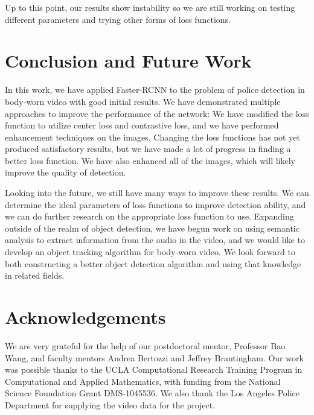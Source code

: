 \documentclass[a4paper]{article}
\begin{document}
Up to this point, our results show instability so we are still working on testing different parameters and trying other forms of loss functions.


\section{Conclusion and Future Work}

In this work, we have applied Faster-RCNN to the problem of police detection in body-worn video with good initial results. We have demonstrated multiple approaches to improve the performance of the network: We have modified the loss function to utilize center loss and contrastive loss, and we have performed enhancement techniques on the images. Changing the loss functions has not yet produced satisfactory results, but we have made a lot of progress in finding a better loss function. We have also enhanced all of the images, which will likely improve the quality of detection.

Looking into the future, we still have many ways to improve these results. We can determine the ideal parameters of loss functions to improve detection ability, and we can do further research on the appropriate loss function to use. Expanding outside of the realm of object detection, we have begun work on using semantic analysis to extract information from the audio in the video, and we would like to develop an object tracking algorithm for body-worn video. We look forward to both constructing a better object detection algorithm and using that knowledge in related fields.

\section*{Acknowledgements}
We are very grateful for the help of our postdoctoral mentor, Professor Bao Wang, and faculty mentors Andrea Bertozzi and Jeffrey Brantingham. Our work was possible thanks to the UCLA Computational Research Training Program in Computational and Applied Mathematics, with funding from the National Science Foundation Grant DMS-1045536. We also thank the Los Angeles Police Department for supplying the video data for the project.

\maketitle
\nocite{*}


\end{document}
